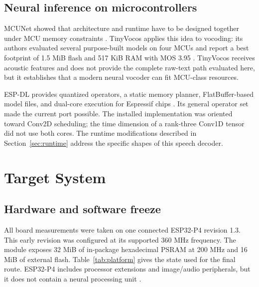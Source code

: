 \documentclass[10pt]{article}
\begin{document}
\subsection{Neural inference on microcontrollers}

MCUNet showed that architecture and runtime have to be designed together
under MCU memory constraints \cite{lin2020mcunet}. TinyVocos applies this idea
to vocoding: its authors evaluated several purpose-built models on four MCUs
and report a best footprint of 1.5 MiB flash and 517 KiB RAM with MOS 3.95
\cite{ciapponi2024tinyvocos}. TinyVocos receives acoustic features and does not
provide the complete raw-text path evaluated here, but it establishes that a
modern neural vocoder can fit MCU-class resources.

ESP-DL provides quantized operators, a static memory planner, FlatBuffer-based
model files, and dual-core execution for Espressif chips
\cite{espressif2026espdl}. Its general operator set made the current port
possible. The installed implementation was oriented toward Conv2D scheduling;
the time dimension of a rank-three Conv1D tensor did not use both cores. The
runtime modifications described in Section~\ref{sec:runtime} address the
specific shapes of this speech decoder.

\section{Target System}

\subsection{Hardware and software freeze}

All board measurements were taken on one connected ESP32-P4 revision 1.3.
This early revision was configured at its supported 360 MHz frequency. The
module exposes 32 MiB of in-package hexadecimal PSRAM at 200 MHz and 16 MiB
of external flash. Table~\ref{tab:platform} gives the state used for the final
route. ESP32-P4 includes processor extensions and image/audio peripherals,
but it does not contain a neural processing unit \cite{espressif2026p4}.
\end{document}
